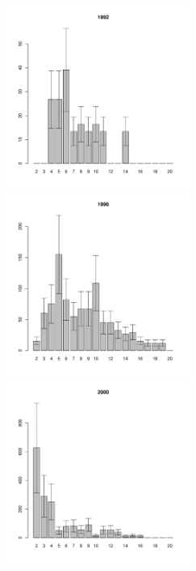	\begin{figure}[hp]

	\begin{minipage}[b]{.3\linewidth}
	\begin{center}
	\includegraphics[width=60mm]{../White_Sea/Luvenga_II_razrez/fucus_zone2_1992_.pdf}	
	\end{center}
	\end{minipage}
	\hfil %
	\begin{minipage}[b]{.3\linewidth}
	\begin{center}
	\includegraphics[width=60mm]{../White_Sea/Luvenga_II_razrez/fucus_zone2_1996_.pdf}
	\end{center}
	\end{minipage}
	\hfil %
	\begin{minipage}[b]{.3\linewidth}
	\begin{center}
\includegraphics[width=60mm]{../White_Sea/Luvenga_II_razrez/fucus_zone2_2000_.pdf}

\end{center}
\end{minipage}
\end{figure}
